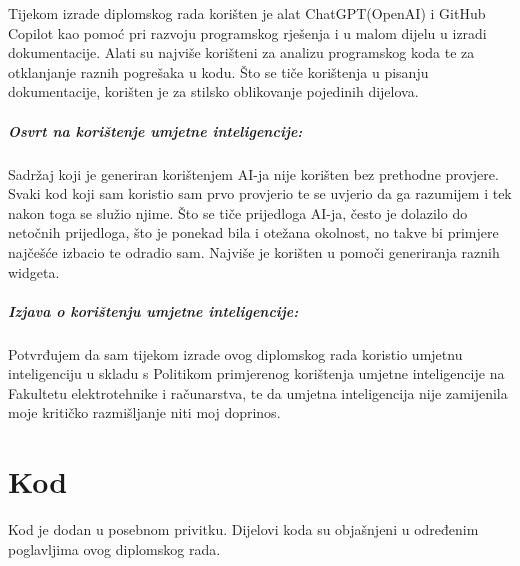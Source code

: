 \documentclass[diplomskirad]{fer}
\begin{document}





\begin{izjavaoui}

  Tijekom izrade diplomskog rada korišten je alat ChatGPT(OpenAI) i GitHub Copilot kao pomoć pri razvoju programskog rješenja i u malom dijelu u izradi dokumentacije. Alati su najviše korišteni za analizu programskog koda te za otklanjanje raznih pogrešaka u kodu. Što se tiče korištenja u pisanju dokumentacije, korišten je za stilsko oblikovanje pojedinih dijelova.
  
  \paragraph{Osvrt na korištenje umjetne inteligencije:}
  Sadržaj koji je generiran korištenjem AI-ja nije korišten bez prethodne provjere. Svaki kod koji sam koristio sam prvo provjerio te se uvjerio da ga razumijem i tek nakon toga se služio njime. Što se tiče prijedloga AI-ja, često je dolazilo do netočnih prijedloga, što je ponekad bila i otežana okolnost, no takve bi primjere najčešće izbacio te odradio sam. Najviše je korišten u pomoči generiranja raznih widgeta. 

  \paragraph{Izjava o korištenju umjetne inteligencije:}
  Potvrđujem da sam tijekom izrade ovog diplomskog rada koristio umjetnu inteligenciju u skladu s
  Politikom primjerenog korištenja umjetne inteligencije na Fakultetu elektrotehnike i računarstva,
  te da umjetna inteligencija nije zamijenila moje kritičko razmišljanje niti moj doprinos.
  
\end{izjavaoui}



\backmatter

\chapter{Kod}
Kod je dodan u posebnom privitku. Dijelovi koda su objašnjeni u određenim poglavljima ovog diplomskog rada.
\end{document}
